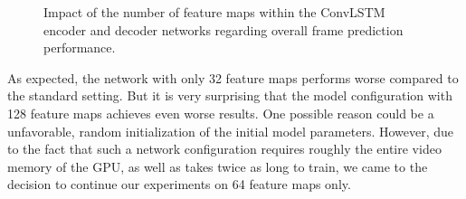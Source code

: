 \begin{figure}[htb]
\begin{subfigure}{0.5\textwidth}
{
  }
  \caption{}
  \label{fig:plot-mm-filter-bce}
\end{subfigure}%
\begin{subfigure}{0.5\textwidth}
  \centering
  \modelA
  \modelB
  \modelC
  \hspace*{-0.6cm}
  {
  }
  \caption{}
  \label{fig:plot-mm-filter-psnr}
\end{subfigure}
\caption[Influences of ConvLSTM Feature Maps]{Impact of the number of feature maps within the ConvLSTM encoder and decoder networks regarding overall frame prediction performance.} \label{fig:plot-mm-filter}
\end{figure}

As expected, the network with only 32 feature maps performs worse compared to the standard setting. But it is very surprising that the model configuration with 128 feature maps achieves even worse results. One possible reason could be a unfavorable, random initialization of the initial model parameters. However, due to the fact that such a network configuration requires roughly the entire video memory of the GPU, as well as takes twice as long to train, we came to the decision to continue our experiments on 64 feature maps only.


